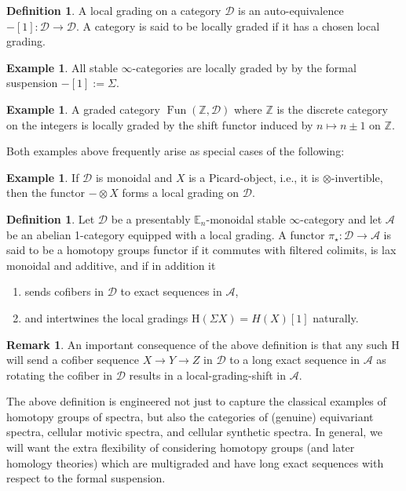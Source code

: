 \documentclass[10pt]{amsart}
\theoremstyle{definition}
\numberwithin{figure}{section}
\numberwithin{equation}{section}
\newtheorem{definition}[figure]{Definition}
\newtheorem{remark}[figure]{Remark}
\newtheorem{example}[figure]{Example}
\newcommand{\cA}{\mathcal{A}}
\newcommand{\cD}{\mathcal{D}}
\theoremstyle{cited}
\newcommand{\bZ}{\mathbb{Z}}
\newcommand{\bE}{\mathbb{E}}
\newcommand{\Fun}{\operatorname{Fun}}
\renewcommand{\H}{\mathrm{H}}
\begin{document}
\begin{definition}
  A local grading on a category $\cD$ is an auto-equivalence $-[1]:\cD\to \cD$. A category is said to be locally graded if it has a chosen local grading.
\end{definition}

\begin{example}
  All stable $\infty$-categories are locally graded by by the formal suspension $-[1]:=\Sigma$. 
\end{example}

\begin{example}
  A graded category $\Fun(\bZ,\cD)$ where $\bZ$ is the discrete category on the integers is locally graded by the shift functor induced by $n\mapsto n\pm 1$ on $\bZ$.
\end{example}

Both examples above frequently arise as special cases of the following:

\begin{example}
  If $\cD$ is monoidal and $X$ is a Picard-object, i.e., it is $\otimes$-invertible, then the functor $-\otimes X$ forms a local grading on $\cD$.
\end{example}

\begin{definition}
  Let $\cD$ be a presentably $\bE_n$-monoidal stable $\infty$-category and let $\cA$ be an abelian 1-category equipped with a local grading. A functor $\pi_\star:\cD\to \cA$ is said to be a homotopy groups functor if it commutes with filtered colimits, is lax monoidal and additive, and if in addition it
  \begin{enumerate}
    \item sends cofibers in $\cD$ to exact sequences in $\cA$,
    \item and intertwines the local gradings $\H(\Sigma X)=H(X)[1]$ naturally.
  \end{enumerate}
\end{definition}

\begin{remark}
  An important consequence of the above definition is that any such $\H$ will send a cofiber sequence $X\to Y\to Z$ in $\cD$ to a long exact sequence in $\cA$ as rotating the cofiber in $\cD$ results in a local-grading-shift in $\cA$.
\end{remark}

The above definition is engineered not just to capture the classical examples of homotopy groups of spectra, but also the categories of (genuine) equivariant spectra, cellular motivic spectra, and cellular synthetic spectra. In general, we will want the extra flexibility of considering homotopy groups (and later homology theories) which are multigraded and have long exact sequences with respect to the formal suspension.
\end{document}
